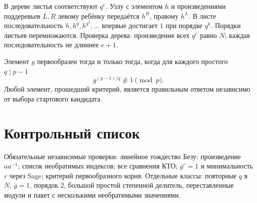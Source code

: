 \documentclass[12pt]{ca-capstone}
\begin{document}
В дереве листья соответствуют $q^e$. Узлу с элементом $h$ и произведениями поддеревьев $L,R$
левому ребёнку передаётся $h^R$, правому $h^L$. В листе последовательность
$h,h^q,h^{q^2},\ldots$ впервые достигает $1$ при порядке $q^k$. Порядки листьев перемножаются.
Проверка дерева: произведение всех $q^e$ равно $N$; каждая последовательность не длиннее $e+1$.

Элемент $g$ первообразен тогда и только тогда, когда для каждого простого $q\mid p-1$
\[
 g^{(p-1)/q}\not\equiv1\pmod p.
\]
Любой элемент, прошедший критерий, является правильным ответом независимо от выбора стартового
кандидата.

\clearpage
\section{Контрольный список}
Обязательные независимые проверки: линейное тождество Безу; произведение $aa^{-1}$; список
необратимых индексов; все сравнения КТО; $g^r=1$ и минимальность $r$ через Sage; критерий
первообразного корня. Отдельные классы: повторные $q$ в $N$, $g=1$, порядок $2$, большой
простой степенной делитель, переставленные модули и пакет с несколькими необратимыми значениями.

\end{document}
